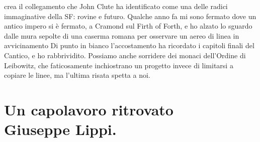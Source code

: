 crea il collegamento che John Clute ha identificato come una delle radici immaginative della SF: rovine e futuro. Qualche anno fa mi sono fermato dove un antico impero si è fermato, a Cramond sul Firth of Forth, e ho alzato lo sguardo dalle mura sepolte di una caserma romana per osservare un aereo di linea in avvicinamento Di punto in bianco l'accostamento ha ricordato i capitoli finali del Cantico, e ho rabbrividito. Possiamo anche sorridere dei monaci dell'Ordine di Leibowitz, che faticosamente inchiostrano un progetto invece di limitarsi a copiare le linee, ma l'ultima risata spetta a noi. 

{ \chapter*{Un capolavoro ritrovato\\{\footnotesize Giuseppe Lippi.}}}
